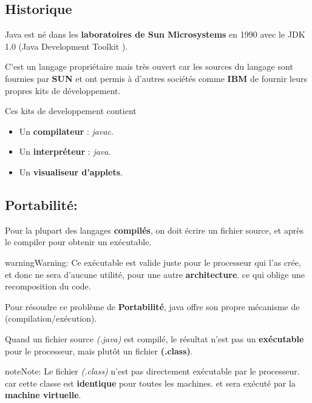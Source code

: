\documentclass[letterpaper,10pt,english]{sphinxmanual}
\begin{document}
\subsection{Historique}
\label{java:historique}
Java est né dans les \textbf{laboratoires de Sun Microsystems} en 1990 avec le JDK 1.0 (Java Development Toolkit ).

C'est un langage propriétaire mais très ouvert car les sources du langage sont fournies par \textbf{SUN} et ont permis à d'autres sociétés comme \textbf{IBM} de fournir leurs propres kits de développement.

Ces kits de developpement contient
\begin{itemize}
\item {} 
Un \textbf{compilateur} : \emph{javac}.

\item {} 
Un \textbf{interpréteur}    : \emph{java}.

\item {} 
Un \textbf{visualiseur d'applets}.

\end{itemize}


\subsection{Portabilité:}
\label{java:portabilite}
Pour la plupart des langages \textbf{compilés}, on doit écrire un fichier source, et après le compiler pour obtenir un exécutable.

\begin{notice}{warning}{Warning:}
Ce exécutable est valide juste pour le processeur qui l'as crée, et donc ne sera d'aucune utilité, pour une autre \textbf{architecture}. ce qui oblige une recomposition du code.
\end{notice}

Pour résoudre ce problème de \textbf{Portabilité}, java offre son propre mécanisme de (compilation/exécution).

Quand un fichier source \emph{(.java)} est compilé, le résultat n'est pas un \textbf{exécutable} pour le processeur, mais plutôt un fichier \textbf{(.class)}.

\begin{notice}{note}{Note:}
Le fichier \emph{(.class)} n'est pas directement exécutable par le processeur. car cette classe est \textbf{identique} pour toutes les machines. et sera exécuté par la \textbf{machine virtuelle}.
\end{notice}
\end{document}
